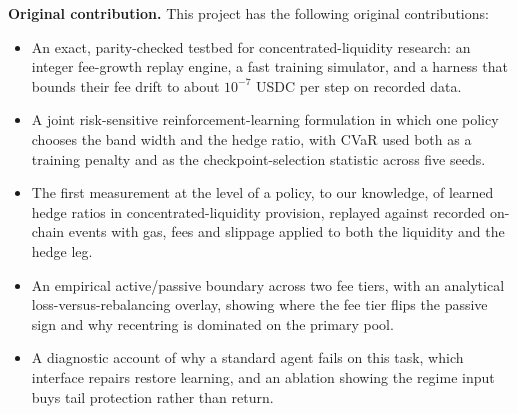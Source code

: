\begin{titlepage}
\begin{center}
\vspace{0.9cm}

\begin{minipage}{0.92\linewidth}
\small
\textbf{Original contribution.} This project has the following original
contributions:
\begin{itemize}\setlength\itemsep{0.15em}
  \item An exact, parity-checked testbed for concentrated-liquidity research:
  an integer fee-growth replay engine, a fast training simulator, and a harness
  that bounds their fee drift to about $10^{-7}$ USDC per step on recorded
  data.
  \item A joint risk-sensitive reinforcement-learning formulation in which one
  policy chooses the band width and the hedge ratio, with CVaR used both as a
  training penalty and as the checkpoint-selection statistic across five seeds.
  \item The first measurement at the level of a policy, to our knowledge, of
  learned hedge ratios in concentrated-liquidity provision, replayed against recorded
  on-chain events with gas, fees and slippage applied to both the liquidity
  and the hedge leg.
  \item An empirical active/passive boundary across two fee tiers, with an
  analytical loss-versus-rebalancing overlay, showing where the fee tier flips
  the passive sign and why recentring is dominated on the primary pool.
  \item A diagnostic account of why a standard agent fails on this task, which
  interface repairs restore learning, and an ablation showing the regime input
  buys tail protection rather than return.
\end{itemize}
\end{minipage}

\vspace*{0.5cm}
\end{center}
\end{titlepage}
